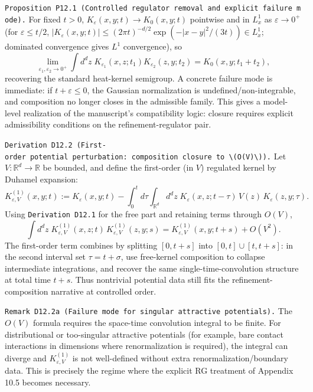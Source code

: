 \documentclass[
]{article}
\begin{document}
\texttt{Proposition\ P12.1\ (Controlled\ regulator\ removal\ and\ explicit\ failure\ mode).}
For fixed \(t>0\), \(K_\varepsilon(x,y;t)\to K_0(x,y;t)\) pointwise and
in \(L^1_x\) as \(\varepsilon\to0^+\) (for \(\varepsilon\le t/2\),
\(|K_\varepsilon(x,y;t)|\le (2\pi t)^{-d/2}\exp(-|x{-}y|^2/(3t))\in L^1_x\);
dominated convergence gives \(L^1\) convergence), so \[
\lim_{\varepsilon_1,\varepsilon_2\to0^+}
\int d^dz\;K_{\varepsilon_1}(x,z;t_1)K_{\varepsilon_2}(z,y;t_2)
=
K_0(x,y;t_1+t_2),
\] recovering the standard heat-kernel semigroup. A concrete failure
mode is immediate: if \(t+\varepsilon\le 0\), the Gaussian normalization
is undefined/non-integrable, and composition no longer closes in the
admissible family. This gives a model-level realization of the
manuscript's compatibility logic: closure requires explicit
admissibility conditions on the refinement-regulator pair.

\texttt{Derivation\ D12.2\ (First-order\ potential\ perturbation:\ composition\ closure\ to\ \textbackslash{}(O(V)\textbackslash{})).}
Let \(V:\mathbb R^d\to\mathbb R\) be bounded, and define the first-order
(in \(V\)) regulated kernel by Duhamel expansion: \[
K_{\varepsilon,V}^{(1)}(x,y;t)
:=
K_\varepsilon(x,y;t)
-\int_0^t d\tau\int_{\mathbb R^d} d^dz\;
K_\varepsilon(x,z;t-\tau)\,V(z)\,K_\varepsilon(z,y;\tau).
\] Using \texttt{Derivation\ D12.1} for the free part and retaining
terms through \(O(V)\), \[
\int d^dz\;K_{\varepsilon,V}^{(1)}(x,z;t)\,K_{\varepsilon,V}^{(1)}(z,y;s)
=K_{\varepsilon,V}^{(1)}(x,y;t+s)+O(V^2).
\] The first-order term combines by splitting \([0,t+s]\) into
\([0,t]\cup[t,t+s]\): in the second interval set \(\tau=t+\sigma\), use
free-kernel composition to collapse intermediate integrations, and
recover the same single-time-convolution structure at total time
\(t+s\). Thus nontrivial potential data still fits the
refinement-composition narrative at controlled order.

\texttt{Remark\ D12.2a\ (Failure\ mode\ for\ singular\ attractive\ potentials).}
The \(O(V)\) formula requires the space-time convolution integral to be
finite. For distributional or too-singular attractive potentials (for
example, bare contact interactions in dimensions where renormalization
is required), the integral can diverge and \(K_{\varepsilon,V}^{(1)}\)
is not well-defined without extra renormalization/boundary data. This is
precisely the regime where the explicit RG treatment of Appendix 10.5
becomes necessary.
\end{document}
